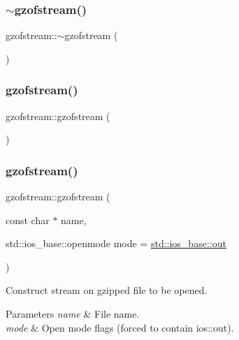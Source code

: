 \subsubsection{\texorpdfstring{$\sim$gzofstream()}{~gzofstream()}}
{\footnotesize\ttfamily gzofstream\+::$\sim$gzofstream (\begin{DoxyParamCaption}{ }\end{DoxyParamCaption})\hspace{0.3cm}{\ttfamily [virtual]}}

\mbox{\label{classgzofstream_ae92ce0e4696e29741ee979f08cf5f7d2}} 
\subsubsection{\texorpdfstring{gzofstream()}{gzofstream()}\hspace{0.1cm}{\footnotesize\ttfamily [4/6]}}
{\footnotesize\ttfamily gzofstream\+::gzofstream (\begin{DoxyParamCaption}{ }\end{DoxyParamCaption})}

\mbox{\label{classgzofstream_a4334d31aab99f8c9c2277b672a55c78f}} 
\subsubsection{\texorpdfstring{gzofstream()}{gzofstream()}\hspace{0.1cm}{\footnotesize\ttfamily [5/6]}}
{\footnotesize\ttfamily gzofstream\+::gzofstream (\begin{DoxyParamCaption}\item[{const char $\ast$}]{name,  }\item[{std\+::ios\+\_\+base\+::openmode}]{mode = {\ttfamily \mbox{\hyperlink{gun_8c_acb2d4658684492100bc328998f52ae82}{std\+::ios\+\_\+base\+::out}}} }\end{DoxyParamCaption})\hspace{0.3cm}{\ttfamily [explicit]}}



Construct stream on gzipped file to be opened. 


\begin{DoxyParams}{Parameters}
{\em name} & File name. \\
\hline
{\em mode} & Open mode flags (forced to contain ios\+::out). \\
\hline
\end{DoxyParams}
\mbox{\label{classgzofstream_aa94d0c8414119a52f2a7f42aa0440941}} 
